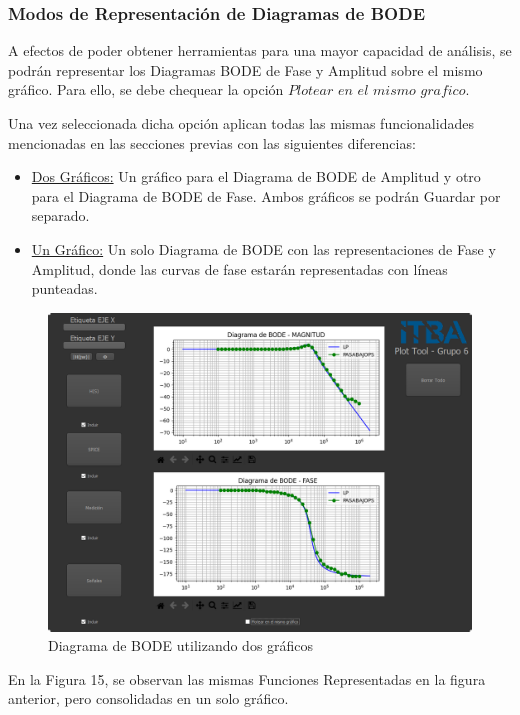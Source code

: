 \subsubsection{Modos de Representación de Diagramas de BODE}

A efectos de poder obtener herramientas para una mayor capacidad de análisis, se podrán representar los Diagramas BODE de Fase y Amplitud sobre el mismo gráfico. 
Para ello, se debe chequear la opción $Plotear$ $en$ $el$ $mismo$ $grafico$.

Una vez seleccionada dicha opción aplican todas las mismas funcionalidades mencionadas en las secciones previas con las siguientes diferencias:

\begin{itemize}
    \item \underline{Dos Gráficos:} Un gráfico para el Diagrama de BODE de Amplitud y otro para el Diagrama de BODE de Fase. Ambos gráficos se podrán Guardar por separado.
    \item \underline{Un Gráfico:} Un solo Diagrama de BODE con las representaciones de Fase y Amplitud, donde las curvas de fase estarán representadas con líneas punteadas.

\end{itemize}


\begin{figure}[!htb] 
    \centering 
    \includegraphics [width=0.8
    \textwidth] {../EJ2/LatexScreenshots/plotToolDosGraficos.png} 
    \caption{Diagrama de BODE utilizando dos gráficos}
    \label{fig:checkBoxPlotTool}
\end{figure}

En la Figura 15, se observan las mismas Funciones Representadas en la figura anterior, pero consolidadas en un solo gráfico.

